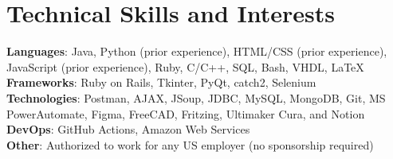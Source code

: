 \section{Technical Skills and Interests}
    \begin{itemize}[leftmargin=0.15in, label={}]
	\small{\item{
		\textbf{Languages}{: Java, Python (prior experience), HTML/CSS (prior experience), JavaScript (prior experience), Ruby, C/C++, SQL, Bash, VHDL, LaTeX} \\
		\textbf{Frameworks}{: Ruby on Rails, Tkinter, PyQt, catch2, Selenium} \\
		\textbf{Technologies}{: Postman, AJAX, JSoup, JDBC, MySQL, MongoDB, Git, MS PowerAutomate, Figma, FreeCAD, Fritzing, Ultimaker Cura, and Notion} \\
		\textbf{DevOps}{: GitHub Actions, Amazon Web Services} \\
        \textbf{Other}{: Authorized to work for any US employer (no sponsorship required)}
	}}
    \end{itemize}
